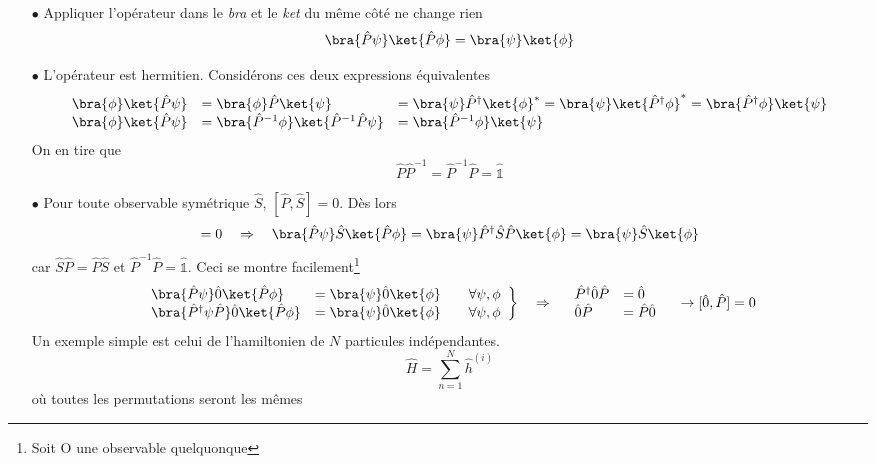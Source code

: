 \begin{itemize}
\item[$\bullet$] Appliquer l'opérateur dans le \textit{bra} et le \textit{ket} du même côté ne change rien
\begin{equation}
\bra{\hat{P}\psi}\ket{\hat{P}\phi} = \bra{\psi}\ket{\phi}
\end{equation}
\item[$\bullet$] L'opérateur est hermitien. Considérons ces deux expressions équivalentes
\begin{equation}
\begin{array}{lll}
\bra{\phi}\ket{\hat{P}\psi} &= \bra{\phi}\hat{P}\ket{\psi}  &= \bra{\psi}\hat{P}^\dagger\ket{\phi}^* = 
\bra{\psi}\ket{\hat{P}^\dagger\phi}^* = \bra{\hat{P}^\dagger \phi}\ket{\psi}\\
\bra{\phi}\ket{\hat{P}\psi} &= \bra{\hat{P}^{-1}\phi}\ket{\hat{P}^{-1}\hat{P}\psi} &= \bra{\hat{P}^{-1}\phi}\ket{\psi}
\end{array}
\end{equation}
On en tire que
\begin{equation}
\hat{P}\hat{P}^{-1} = \hat{P}^{-1}\hat{P} = \hat{\mathbb{1}}
\end{equation}
\item[$\bullet$] Pour toute observable symétrique $\hat{S}$, $[\hat{P},\hat{S}]=0$. Dès lors
\begin{equation}
[\hat{P},\hat{S}] = 0\quad\Rightarrow\quad \bra{\hat{P}\psi}\hat{S}\ket{\hat{P}\phi} = 
\bra{\psi}\hat{P}^\dagger\hat{S}\hat{P}\ket{\phi} = \bra{\psi}\hat{S}\ket{\phi}
\end{equation}
car $\hat{S}\hat{P}=\hat{P}\hat{S}$ et $\hat{P}^{-1}\hat{P} = \hat{\mathbb{1}}$. Ceci se montre facilement\footnote{Soit O une observable quelquonque}
\begin{equation}
\left.\begin{array}{lll}
\bra{\hat{P}\psi}\hat{0}\ket{\hat{P}\phi} &= \bra{\psi}\hat{0}\ket{\phi}&\quad \forall\psi,\phi\\
\bra{\hat{P}^\dagger\psi\hat{P}}\hat{0}\ket{\hat{P}\phi} &= \bra{\psi}\hat{0}\ket{\phi}&\quad \forall\psi,\phi
\end{array}\right\}\quad\Rightarrow\quad \begin{array}{ll}
\hat{P}^\dagger\hat{0}\hat{P} &= \hat{0}\\
\hat{0}\hat{P} &= \hat{P}\hat{0}
\end{array}\quad\rightarrow[\hat{0},\hat{P}] = 0
\end{equation}
Un exemple simple est celui de l'hamiltonien de $N$ particules indépendantes. 
\begin{equation}
\hat{H} = \sum_{n=1}^N \hat{h}^{(i)}
\end{equation}
où toutes les permutations seront les mêmes
\end{itemize}

